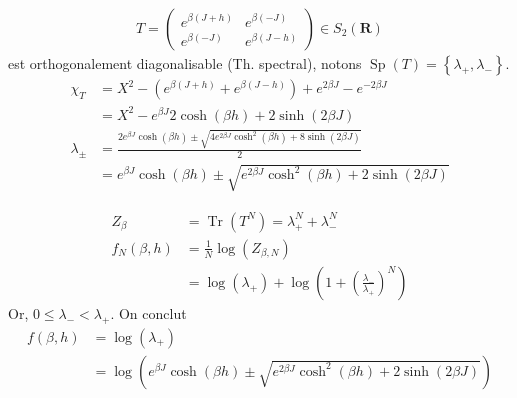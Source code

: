 \documentclass[french]{beamer}
\DeclareMathOperator{\Tr}{Tr}
\DeclareMathOperator{\Sp}{Sp}
\begin{document}
\begin{frame}

\begin{align*}
T =
\begin{pmatrix}
e^{\beta(J + h)}  &   e^{\beta(- J)} \\
e^{\beta(-J)} & e^{\beta(J - h)}
\end{pmatrix}
\in S_2\left(\mathbf{R}\right)
\end{align*}
est orthogonalement diagonalisable (Th. spectral), notons \(\Sp\left(T\right) = \left\{\lambda_+, \lambda_-\right\}\).
\begin{align*}
\chi_T &= X^2 - \left(e^{\beta(J + h)} + e^{\beta(J - h)}\right) + e^{2\beta J} - e^{-2\beta J} \\
& = X^2 - e^{\beta J}  2\cosh(\beta h) + 2\sinh(2\beta J)\\
\lambda_\pm &= \frac{2e^{\beta J}\cosh(\beta h) \pm \sqrt{4e^{2\beta J}\cosh^2(\beta h) + 8\sinh(2\beta J)}}{2} \\
&= e^{\beta J}\cosh(\beta h) \pm \sqrt{e^{2\beta J}\cosh^2(\beta h) + 2\sinh(2\beta J)}
\end{align*}

\end{frame}


\begin{frame}
\begin{align*}
Z_\beta &= \Tr\left(T^N\right) = \lambda_+^N + \lambda_-^N\\
f_N(\beta,h) &= \frac{1}{N} \log\left(Z_{\beta,N}\right) \\
&=  \log\left(\lambda_+\right)  + \log\left(1 + \left(\frac{\lambda_-}{\lambda_+}\right)^N \right)
\end{align*}
Or, $0 \leq \lambda_- < \lambda_+$. On conclut
\begin{align*}
f(\beta, h) &= \log\left(\lambda_+\right) \\
&= \log\left( e^{\beta J}\cosh(\beta h) \pm \sqrt{e^{2\beta J}\cosh^2(\beta h) + 2\sinh(2\beta J)} \right)
\end{align*}
\end{frame}
\end{document}
